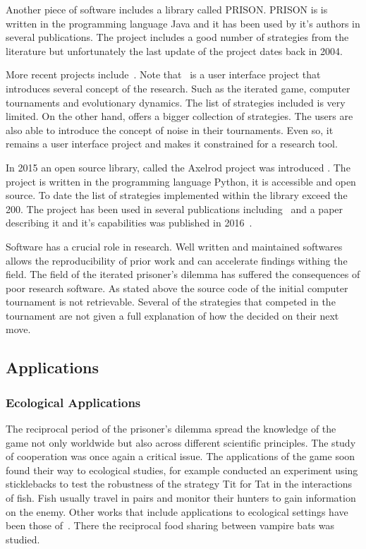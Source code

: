 \documentclass{article}
\begin{document}
Another  piece of software includes a library called PRISON. PRISON is 
is written in the programming language Java and it has been used by it's authors
in several publications. The project includes a good number of strategies from
the literature but unfortunately the last update of the project dates back in 2004.

More recent projects include~\cite{pd_trust, pd_game}. Note that~\cite{pd_trust}
is a user interface project that introduces several concept of the research.
Such as the iterated game, computer tournaments and evolutionary
dynamics. The list of strategies included is very limited. On the other hand,
\cite{pd_game} offers a bigger collection of strategies. The users are also
able to introduce the concept of noise in their tournaments. Even so, 
it remains a user interface project and makes it constrained for a research tool. 

In 2015 an open source library, called the Axelrod project was introduced
\cite{axelrodproject}. The project is written in the programming language 
Python, it is accessible and open source. To date the list of strategies implemented
within the library exceed the 200. The project has been used in several
publications including~\cite{Knight2017} and a paper describing it and
it's capabilities was published in 2016~\cite{Knight2016}.

Software has a crucial role in research. Well written and maintained softwares
allows the reproducibility of prior work and can accelerate findings withing the
field. The field of the iterated prisoner's dilemma has suffered the consequences
of poor research software. As stated above the source code of the initial
computer tournament is not retrievable. Several of the strategies that competed
in the tournament are not given a full explanation of how the decided on their
next move. 

\subsection{Applications}
\subsubsection{Ecological Applications}

The reciprocal period of the prisoner's dilemma spread the knowledge of the
game not only worldwide but also across different scientific principles. The
study of cooperation was once again a critical issue. The applications of
the game soon found their way to ecological studies, for example 
\cite{Milinski1987} conducted an experiment using sticklebacks to test
the robustness of the strategy Tit for Tat in the interactions of fish. Fish usually
travel in pairs and monitor their hunters to gain information on the enemy.
Other works that include applications to ecological settings have been those
of~\cite{Godfray1992, Wilkinson1984}. There the reciprocal food sharing
between vampire bats was studied.
\end{document}
